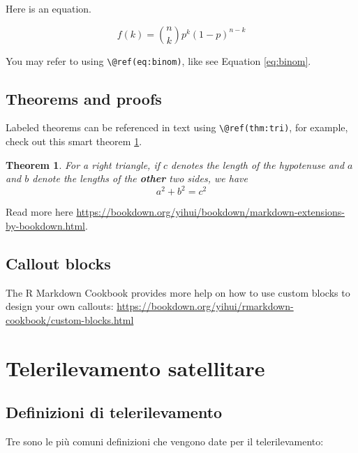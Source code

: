 \documentclass[
]{book}
\newtheorem{theorem}{Theorem}[chapter]
\theoremstyle{definition}
\theoremstyle{definition}
\theoremstyle{definition}
\theoremstyle{definition}
\theoremstyle{remark}
\begin{document}
Here is an equation.

\begin{equation} 
  f\left(k\right) = \binom{n}{k} p^k\left(1-p\right)^{n-k}
  \label{eq:binom}
\end{equation}

You may refer to using \texttt{\textbackslash{}@ref(eq:binom)}, like see Equation \eqref{eq:binom}.

\hypertarget{theorems-and-proofs}{%
\section{Theorems and proofs}\label{theorems-and-proofs}}

Labeled theorems can be referenced in text using \texttt{\textbackslash{}@ref(thm:tri)}, for example, check out this smart theorem \ref{thm:tri}.

\begin{theorem}
\protect\hypertarget{thm:tri}{}\label{thm:tri}For a right triangle, if \(c\) denotes the \emph{length} of the hypotenuse and \(a\) and \(b\) denote the lengths of the \textbf{other} two sides, we have \[a^2 + b^2 = c^2\]
\end{theorem}

Read more here \url{https://bookdown.org/yihui/bookdown/markdown-extensions-by-bookdown.html}.

\hypertarget{callout-blocks}{%
\section{Callout blocks}\label{callout-blocks}}

The R Markdown Cookbook provides more help on how to use custom blocks to design your own callouts: \url{https://bookdown.org/yihui/rmarkdown-cookbook/custom-blocks.html}

\hypertarget{telerilevamento-satellitare}{%
\chapter{Telerilevamento satellitare}\label{telerilevamento-satellitare}}

\hypertarget{definizioni-di-telerilevamento}{%
\section{Definizioni di telerilevamento}\label{definizioni-di-telerilevamento}}

Tre sono le più comuni definizioni che vengono date per il telerilevamento:
\end{document}
